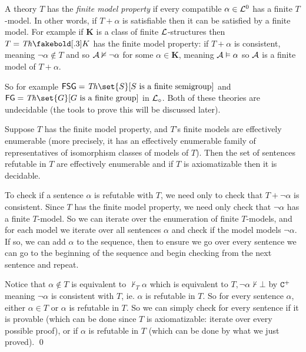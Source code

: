 A theory $T$ has the {\it finite model property} if every compatible $\alpha\in{\cal L}^0$ has a finite $T$-model.
In other words, if $T+\alpha$ is satisfiable then it can be satisfied by a finite model.
For example if $\boldsymbol K$ is a class of finite ${\cal L}$-structures then $T=\Th\boldsymbol K$ has the finite model property: if $T+\alpha$ is consistent, meaning $\neg\alpha\notin T$ and so
${\cal A}\nvDash\neg\alpha$ for some $\alpha\in\boldsymbol K$, meaning ${\cal A}\vDash\alpha$ so ${\cal A}$ is a finite model of $T+\alpha$.

So for example ${\sf FSG}=\Th\set{S}[\hbox{$S$ is a finite semigroup}]$ and ${\sf FG}=\Th\set{G}[\hbox{$G$ is a finite group}]$ in ${\cal L}_\circ$.
Both of these theories are undecidable (the tools to prove this will be discussed later).

\blemm

    Suppose $T$ has the finite model property, and $T$'s finite models are effectively enumerable (more precisely, it has an effectively enumerable family of representatives of isomorphism classes of
    models of $T$).
    Then the set of sentences refutable in $T$ are effectively enumerable and if $T$ is axiomatizable then it is decidable.

\elemm

To check if a sentence $\alpha$ is refutable with $T$, we need only to check that $T+\neg\alpha$ is consistent.
Since $T$ has the finite model property, we need only check that $\neg\alpha$ has a finite $T$-model.
So we can iterate over the enumeration of finite $T$-models, and for each model we iterate over all sentences $\alpha$ and check if the model models $\neg\alpha$.
If so, we can add $\alpha$ to the sequence, then to ensure we go over every sentence we can go to the beginning of the sequence and begin checking from the next sentence and repeat.

Notice that $\alpha\notin T$ is equivalent to $\nvdash_T\alpha$ which is equivalent to $T,\neg\alpha\nvdash\bot$ by ${\tt C}^+$ meaning $\neg\alpha$ is consistent with $T$, ie. $\alpha$ is refutable in $T$.
So for every sentence $\alpha$, either $\alpha\in T$ or $\alpha$ is refutable in $T$.
So we can simply check for every sentence if it is provable (which can be done since $T$ is axiomatizable: iterate over every possible proof), or if $\alpha$ is refutable in $T$ (which can be done by what
we just proved).
\qed

\bthrm[title=Trachtenbrot's Theorem, name=tractenbrottheorem]

